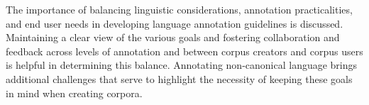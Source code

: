 The importance of balancing linguistic considerations, annotation practicalities, and end user needs in developing language annotation guidelines is discussed. Maintaining a clear view of the various goals and fostering collaboration and feedback across levels of annotation and between corpus creators and corpus users is helpful in determining this balance. Annotating non-canonical language brings additional challenges that serve to highlight the necessity of keeping these goals in mind when creating corpora.
